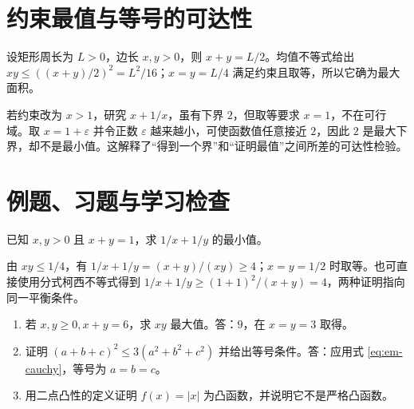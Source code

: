 \section{约束最值与等号的可达性}
设矩形周长为 $L>0$，边长 $x,y>0$，则 $x+y=L/2$。均值不等式给出 $xy\le((x+y)/2)^2=L^2/16$；$x=y=L/4$ 满足约束且取等，所以它确为最大面积。

若约束改为 $x>1$，研究 $x+1/x$，虽有下界 $2$，但取等要求 $x=1$，不在可行域。取 $x=1+\varepsilon$ 并令正数 $\varepsilon$ 越来越小，可使函数值任意接近 $2$，因此 $2$ 是最大下界，却不是最小值。这解释了“得到一个界”和“证明最值”之间所差的可达性检验。

\section{例题、习题与学习检查}
\begin{example}
已知 $x,y>0$ 且 $x+y=1$，求 $1/x+1/y$ 的最小值。
\end{example}
\begin{solve}
由 $xy\le1/4$，有 $1/x+1/y=(x+y)/(xy)\ge4$；$x=y=1/2$ 时取等。也可直接使用分式柯西不等式得到 $1/x+1/y\ge(1+1)^2/(x+y)=4$，两种证明指向同一平衡条件。
\end{solve}
\begin{enumerate}
\item 若 $x,y\ge0,x+y=6$，求 $xy$ 最大值。答：$9$，在 $x=y=3$ 取得。
\item 证明 $(a+b+c)^2\le3(a^2+b^2+c^2)$ 并给出等号条件。答：应用式 \eqref{eq:em-cauchy}，等号为 $a=b=c$。
\item 用二点凸性的定义证明 $f(x)=|x|$ 为凸函数，并说明它不是严格凸函数。
\end{enumerate}

